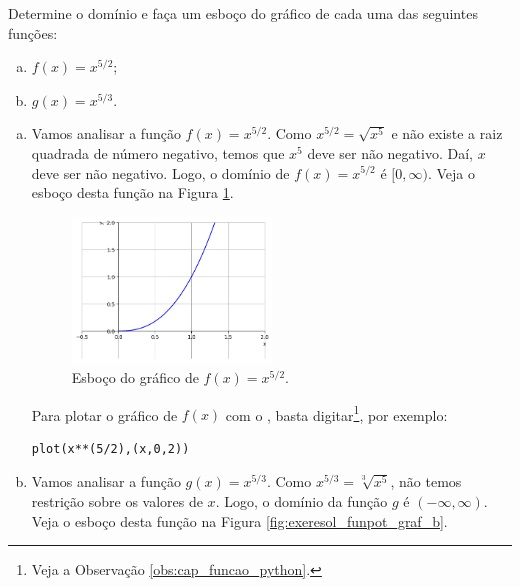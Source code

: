 \begin{exeresol}\label{exeresol:funpot_graf}
  Determine o domínio e faça um esboço do gráfico de cada uma das seguintes funções:
  \begin{enumerate}[a)]
  \item $\displaystyle f(x) = x^{5/2}$;
  \item $\displaystyle g(x) = x^{5/3}$.
  \end{enumerate}
\end{exeresol}
\begin{resol}
  \begin{enumerate}[a)]
  \item Vamos analisar a função $f(x) = x^{5/2}$. Como $x^{5/2} = \sqrt{x^5}$ e não existe a raiz quadrada de número negativo, temos que $x^5$ deve ser não negativo. Daí, $x$ deve ser não negativo. Logo, o domínio de $f(x) = x^{5/2}$ é $[0, \infty)$. Veja o esboço desta função na Figura \ref{fig:exeresol_funpot_graf_a}.

    \begin{figure}[H]
      \centering
      \includegraphics[width=0.5\textwidth]{./cap_funcao/dados/fig_exeresol_funpot_graf/fig_exeresol_funpot_graf_a}
      \caption{Esboço do gráfico de $f(x) = x^{5/2}$.}
      \label{fig:exeresol_funpot_graf_a}
    \end{figure}

    \ifispython
    Para plotar o gráfico de $f(x)$ com o \sympy, basta digitar\footnote{Veja a Observação \ref{obs:cap_funcao_python}.}, por exemplo:
\begin{verbatim}
plot(x**(5/2),(x,0,2))
\end{verbatim}
    \fi
  \item Vamos analisar a função $g(x) = x^{5/3}$. Como $x^{5/3} = \sqrt[3]{x^5}$, não temos restrição sobre os valores de $x$. Logo, o domínio da função $g$ é $(-\infty, \infty)$. Veja o esboço desta função na Figura \ref{fig:exeresol_funpot_graf_b}.


\end{enumerate}
\end{resol}
